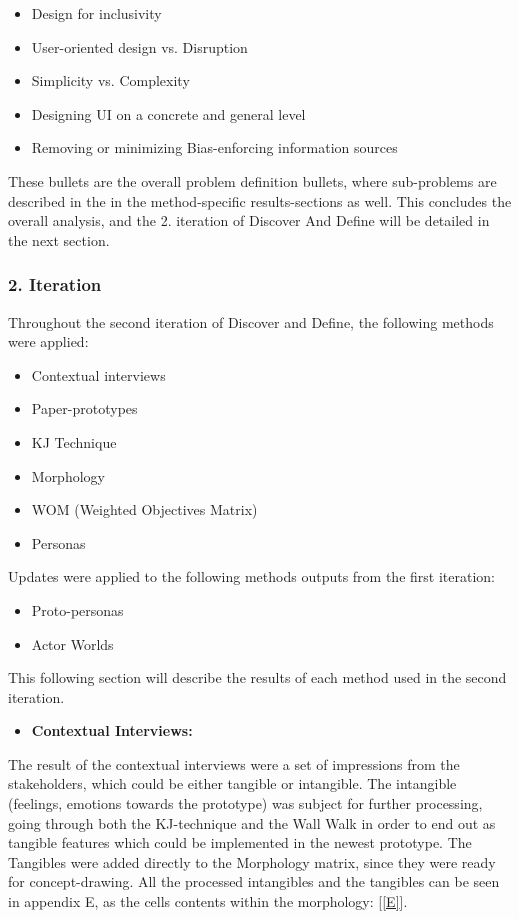 \begin{itemize}
    \item Design for inclusivity
    \item User-oriented design vs. Disruption
    \item Simplicity vs. Complexity
    \item Designing UI on a concrete and general level
    \item Removing or minimizing Bias-enforcing information sources
\end{itemize}

These bullets are the overall problem definition bullets, where sub-problems are described in the in the method-specific results-sections as well. This concludes the overall analysis, and the 2. iteration of Discover And Define will be detailed in the next section. 

\subsubsection{2. Iteration}

Throughout the second iteration of Discover and Define, the following methods were applied:
\begin{itemize}
    \item Contextual interviews
    \item Paper-prototypes
    \item KJ Technique
    \item Morphology
    \item WOM (Weighted Objectives Matrix)
    \item Personas
\end{itemize}

Updates were applied to the following methods outputs from the first iteration:

\begin{itemize}
    \item Proto-personas
    \item Actor Worlds
\end{itemize}

This following section will describe the results of each method used in the second iteration.

\begin{itemize}
    \item \bf{Contextual Interviews:}
\end{itemize}

The result of the contextual interviews were a set of impressions from the stakeholders, which could be either tangible or intangible. The intangible (feelings, emotions towards the prototype) was subject for further processing, going through both the KJ-technique and the Wall Walk in order to end out as tangible features which could be implemented in the newest prototype. The Tangibles were added directly to the Morphology matrix, since they were ready for concept-drawing. All the processed intangibles and the tangibles can be seen in appendix E, as the cells contents within the morphology: [\ref{E}].

